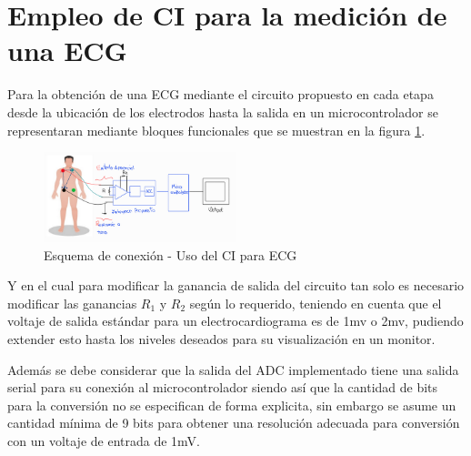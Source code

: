 \documentclass[conference]{IEEEtran}
\begin{document}
	\section{Empleo de CI para la medición de una ECG}
	
	Para la obtención de una ECG mediante el circuito propuesto en \cite{pantuprecharat2023ecg} cada etapa desde la ubicación de los electrodos hasta la salida en un microcontrolador se representaran mediante bloques funcionales que se muestran en la figura \ref{fig:esquema-conexion-uso}.
	
	\begin{figure}[h]
		\centering
		\includegraphics[width=0.5\textwidth]{media/esquema-conexion-uso}
		\caption{Esquema de conexión - Uso del CI para ECG}
		\label{fig:esquema-conexion-uso}
	\end{figure}
	
	Y en el cual para modificar la ganancia de salida del circuito tan solo es necesario modificar las ganancias $R_1$ y $R_2$ según lo requerido, teniendo en cuenta que el voltaje de salida estándar para un electrocardiograma es de 1mv o 2mv, pudiendo extender esto hasta los niveles deseados para su visualización en un monitor.
	
	Además se debe considerar que la salida del ADC implementado tiene una salida serial para su conexión al microcontrolador siendo así que la cantidad de bits para la conversión no se especifican de forma explicita, sin embargo se asume un cantidad mínima de 9 bits para obtener una resolución adecuada para conversión con un voltaje de entrada de 1mV.

	
	
	
\end{document}
